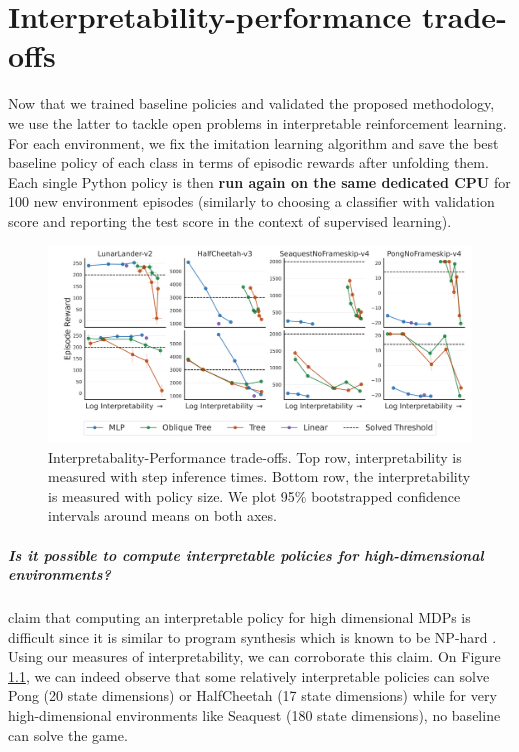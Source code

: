 \chapter{Interpretability-performance trade-offs}\label{sec:exps2}


Now that we trained baseline policies and validated the proposed methodology, we use the latter to tackle open problems in interpretable reinforcement learning. For each environment, we fix the imitation learning algorithm and save the best baseline policy of each class in terms of episodic rewards after unfolding them. Each single Python policy is then \textbf{run again on the same dedicated CPU} for 100 new environment episodes (similarly to choosing a classifier with validation score and reporting the test score in the context of supervised learning).
\begin{figure}
    \centering
    \includegraphics[trim={1.4cm 0 0 0},clip,width=1\textwidth]{images/images_part3/trade_off_select_combine_one_plot.pdf}
    \caption{Interpretabality-Performance trade-offs. Top row, interpretability is measured with step inference times. Bottom row, the interpretability is measured with policy size. We plot 95\% bootstrapped confidence intervals around means on both axes.}
    \label{fig:trade-off-summary}
\end{figure}

\paragraph{Is it possible to compute interpretable policies for high-dimensional environments?} \cite{glanois-survey} claim that computing an interpretable policy for high dimensional MDPs is difficult since it is similar to program synthesis which is known to be NP-hard \cite{program-synth}. Using our measures of interpretability, we can corroborate this claim. On Figure \ref{fig:trade-off-summary}, we can indeed observe that some relatively interpretable policies can solve Pong (20 state dimensions) or HalfCheetah (17 state dimensions) while for very high-dimensional environments like Seaquest (180 state dimensions), no baseline can solve the game.


